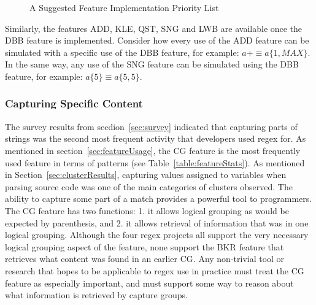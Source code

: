 \begin{figure}[tb]
\caption{A Suggested Feature Implementation Priority List \label{fig:prioritizedList}
}
\end{figure}


Similarly, the features ADD, KLE, QST, SNG and LWB are available once the DBB feature is implemented.  Consider how every use of the ADD feature can be simulated with a specific use of the DBB feature, for example: $a+ \equiv a\{1, MAX\}$.  In the same way, any use of the SNG feature can be simulated using the DBB feature, for example:  $a\{5\} \equiv a\{5, 5\}$.

\leavevmode\color{black}
\subsubsection{Capturing Specific Content}
The survey results from secdion~\ref{sec:survey} indicated that capturing parts of strings was the second most frequent activity that developers used regex for.  As mentioned in section~\ref{sec:featureUsage}, the CG feature is the most frequently used feature in terms of patterns (see Table~\ref{table:featureStats}).  As mentioned in Section~\ref{sec:clusterResults}, capturing values assigned to variables when parsing source code was one of the main categories of clusters observed.  The ability to capture some part of a match provides a powerful tool to programmers.  The CG feature has two functions: 1. it allows logical grouping as would be expected by parenthesis, and 2. it allows retrieval of information that was in one logical grouping.  Although the four regex projects all support the very necessary logical grouping aspect of the feature, none support the BKR feature that retrieves what content was found in an earlier CG.  Any non-trivial tool or research that hopes to be applicable to regex use in practice must treat the CG feature as especially important, and must support some way to reason about what information is retrieved by capture groups.
\leavevmode\color{gray}

